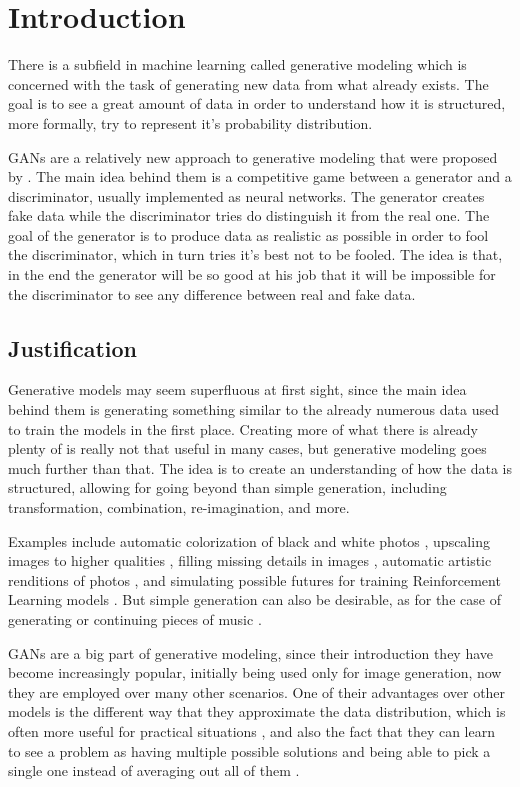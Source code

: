 \chapter{Introduction} \label{cha:introduction}
There is a subfield in machine learning called generative modeling which is concerned with the task of generating new data from what already exists. The goal is to see a great amount of data in order to understand how it is structured, more formally, try to represent it's probability distribution.

\acp{GAN} are a relatively new approach to generative modeling that were proposed by \textcite{gans2014}. The main idea behind them is a competitive game between a generator and a discriminator, usually implemented as neural networks. The generator creates fake data while the discriminator tries do distinguish it from the real one. The goal of the generator is to produce data as realistic as possible in order to fool the discriminator, which in turn tries it's best not to be fooled. The idea is that, in the end the generator will be so good at his job that it will be impossible for the discriminator to see any difference between real and fake data.

\section{Justification}
Generative models may seem superfluous at first sight, since the main idea behind them is generating something similar to the already numerous data used to train the models in the first place. Creating more of what there is already plenty of is really not that useful in many cases, but generative modeling goes much further than that. The idea is to create an understanding of how the data is structured, allowing for going beyond than simple generation, including transformation, combination, re-imagination, and more.

Examples include automatic colorization of black and white photos \cite{colorization_gan2018}, upscaling images to higher qualities \cite{ganSuperResolution2016}, filling missing details in images \cite{inpainting2018}, automatic artistic renditions of photos \cite{stylegan2}, and simulating possible futures for training Reinforcement Learning models \cite{nipsGAN2017}. But simple generation can also be desirable, as for the case of generating or continuing pieces of music \cite{jukebox2020}.

\acp{GAN} are a big part of generative modeling, since their introduction they have become increasingly popular, initially being used only for image generation, now they are employed over many other scenarios. One of their advantages over other models is the different way that they approximate the data distribution, which is often more useful for practical situations \cite{wasserstein2017}, and also the fact that they can learn to see a problem as having multiple possible solutions and being able to pick a single one instead of averaging out all of them \cite{nipsGAN2017}.

